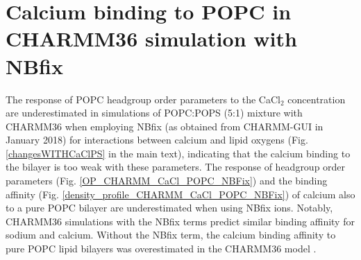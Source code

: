 \documentclass[journal=jpcbfk]{achemso}
\begin{document}
\newpage

%

\section{Calcium binding to POPC in CHARMM36 simulation with NBfix}\label{CHARMMcalciumNBfix}

The response of POPC headgroup order parameters to the CaCl$_2$ concentration
are underestimated in simulations of POPC:POPS (5:1) mixture with CHARMM36 when employing NBfix (as obtained from CHARMM-GUI in January 2018) for interactions between calcium and lipid oxygens \cite{kim16}
(Fig. \ref{changesWITHCaClPS} in the main text),
indicating that the calcium binding to the bilayer is too weak with these
parameters. The response of headgroup order
parameters (Fig. \ref{OP_CHARMM_CaCl_POPC_NBFix}) and the binding affinity
(Fig. \ref{density_profile_CHARMM_CaCl_POPC_NBFix}) of calcium also to a pure
POPC bilayer are underestimated when using NBfix ions.  Notably, CHARMM36 simulations with the NBfix
terms \cite{venable13,kim16} predict similar binding affinity for sodium and calcium. Without the NBfix term, the calcium binding affinity to pure POPC lipid bilayers was overestimated in the CHARMM36 model \cite{catte16}.

\end{document}
